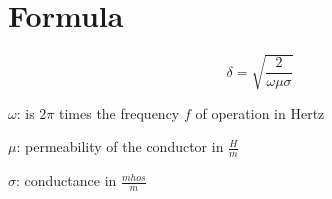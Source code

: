 \documentclass[a4paper, 10pt]{scrartcl}
\begin{document}
\tableofcontents
\newpage

\section{Formula}

\begin{displaymath}
\delta = \sqrt{\frac{2}{\omega\mu\sigma}}
\end{displaymath}

$\omega$: is $2\pi$ times the frequency $f$ of operation in Hertz

$\mu$: permeability of the conductor in $\frac{H}{m}$

$\sigma$: conductance in $\frac{mhos}{m}$
\end{document}
